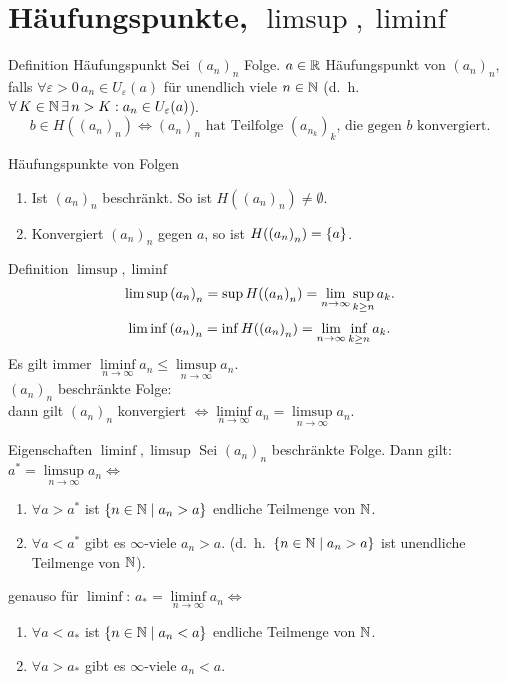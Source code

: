 \documentclass[main.tex]{subfiles}
\begin{document}
\section*{Häufungspunkte, \( \limsup, \liminf\)}

\begin{karte}{Definition Häufungspunkt}
    Sei \({(a_n)}_n\) Folge. \(a\in\mathbb{R} \) Häufungspunkt 
    von \({(a_n)}_n\), falls \(\forall\varepsilon>0\, 
    a_n\in U_\varepsilon(a) \) für unendlich viele 
    \(n\in\mathbb{N} \) (d.\ h.\  \( \forall K\in\N \,\exists 
    n>K:a_n \in U_\varepsilon (a) \)).
    \[ b\in H({(a_n)}_n) \Leftrightarrow 
    {(a_n)}_n \text{ hat Teilfolge } 
    {(a_{n_k})}_k \text{, die gegen } 
    b \text{ konvergiert}. \]
\end{karte}
\begin{karte}{Häufungspunkte von Folgen}
    \begin{enumerate}
        \item Ist \({(a_n)}_n\) beschränkt. 
        So ist \(H({(a_n)}_n) \neq \emptyset \).
        \item Konvergiert \({(a_n)}_n\) gegen 
        \(a\), so ist \( H({(a_n)}_n) = \{a\} \).
	\end{enumerate}
\end{karte}
\begin{karte}{Definition \( \limsup, \liminf \)}
    \[ \limsup {(a_n)}_n = \sup H({(a_n)}_n) = \lim\limits_{n\rightarrow\infty} \sup_{k\geq n} a_k. \]
    \[ \liminf {(a_n)}_n = \inf H({(a_n)}_n) = \lim\limits_{n\rightarrow\infty} \inf_{k\geq n} a_k. \]
    Es gilt immer \( \liminf\limits_{n\rightarrow\infty}
    a_n \leq \limsup\limits_{n\rightarrow\infty}a_n \). \\
    \({(a_n)}_n\) beschränkte Folge:\\
    dann gilt \({(a_n)}_n\) konvergiert \( \Leftrightarrow 
    \liminf\limits_{n\rightarrow\infty}
    a_n = \limsup\limits_{n\rightarrow\infty}a_n\).
\end{karte}
\begin{karte}{Eigenschaften \(\liminf, \limsup \)}
    Sei \({(a_n)}_n\) beschränkte Folge. Dann gilt:\\
	\(a^* = \limsup\limits_{n\rightarrow\infty}a_n \Leftrightarrow \)
	\begin{enumerate}
        \item \(\forall a> a^* \) ist \( \{n\in\mathbb{N} \;\vert \; a_n>a\} \) 
        endliche Teilmenge von \(\mathbb{N} \).
        \item \( \forall a<a^* \) gibt es \(\infty \)-viele \(a_n >a\). 
        (d.\ h.\  \( \{ n\in\mathbb{N} \;\vert \; a_n>a\} \) ist unendliche 
        Teilmenge von \(\mathbb{N} \)).
	\end{enumerate}
	genauso für \( \liminf \):
	\(a_* = \liminf\limits_{n\rightarrow\infty}a_n \Leftrightarrow \)
	\begin{enumerate}
        \item \(\forall a< a_* \) ist \( \{n\in\mathbb{N} \;\vert \; a_n<a\} \) 
        endliche Teilmenge von \(\mathbb{N} \).
		\item \( \forall a>a_* \) gibt es \(\infty \)-viele \(a_n<a\).
    \end{enumerate}
\end{karte}
\end{document}

